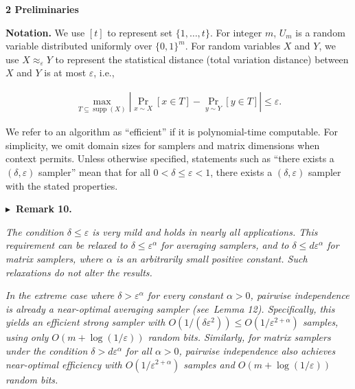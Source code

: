 \documentclass[10pt,a4paper]{article}
\begin{document}






\par\medskip\noindent\textbf{
2 Preliminaries}\par




\textbf{Notation.} We use $[t]$ to represent set $\{1,\dots,t\}$. For integer $m$, $U_{m}$ is a random variable distributed uniformly over $\{0,1\}^{m}$. For random variables $X$ and $Y$, we use $X\approx_{\varepsilon}Y$ to represent the statistical distance (total variation distance) between $X$ and $Y$ is at most $\varepsilon$, i.e.,\par


\[\begin{gathered}
\max_{T\subseteq\operatorname*{supp}(X)}\left|\Pr_{x\sim X}[x\in T]-\Pr_{y\sim
Y}[y\in T]\right|\leq\varepsilon.
\end{gathered}\]




We refer to an algorithm as “efficient” if it is polynomial-time computable.
For simplicity, we omit domain sizes for samplers and matrix dimensions when context permits. Unless otherwise specified, statements such as “there exists a $(\delta,\varepsilon)$ sampler” mean that for all $0<\delta\leq\varepsilon<1$, there exists a $(\delta,\varepsilon)$ sampler with the stated properties.\par





\par\medskip\noindent\textbf{
$\blacktriangleright$ Remark 10.
}\par



\emph{The condition $\delta\leq\varepsilon$ is very mild and holds in nearly all applications.
This requirement can be relaxed to $\delta\leq\varepsilon^{\alpha}$ for averaging samplers, and to $\delta\leq d\varepsilon^{\alpha}$ for matrix samplers, where $\alpha$ is an arbitrarily small positive constant. Such relaxations do not alter the results.}\par




\emph{In the extreme case where $\delta>\varepsilon^{\alpha}$ for every constant $\alpha>0$, pairwise independence is already a near-optimal averaging sampler (see Lemma 12). Specifically, this yields an efficient strong sampler with $O(1/(\delta\varepsilon^{2}))\leq O(1/\varepsilon^{2+\alpha})$ samples, using only $O(m+\log(1/\varepsilon))$ random bits.
Similarly, for matrix samplers under the condition $\delta>d\varepsilon^{\alpha}$ for all $\alpha>0$, pairwise independence also achieves near-optimal efficiency with $O(1/\varepsilon^{2+\alpha})$ samples and $O(m+\log(1/\varepsilon))$ random bits.}\par
\end{document}
